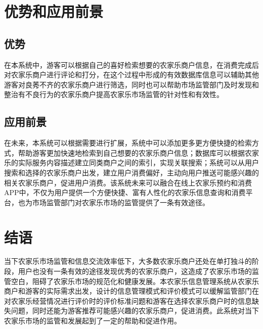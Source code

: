\documentclass[]{article}
\begin{document}
	\section{优势和应用前景}
	\subsection{优势}
	在本系统中，游客可以根据自己的喜好检索想要的农家乐商户信息，在消费完成后对农家乐商户进行评论和打分，在这个过程中形成的有效数据库信息可以辅助其他游客对良莠不齐的农家乐商户进行筛选，同时也可以帮助市场监管部门及时发现和整治有不良行为的农家乐商户提高农家乐市场监管的针对性和有效性。
	\subsection{应用前景}
	在未来，本系统可以根据需要进行扩展，系统中可以添加更多更方便快捷的检索方式，帮助游客更加快速地检索到自己想要的农家乐商户信息；数据库可以根据农家乐的实际服务内容描述建立同类商户之间的索引，实现关联搜索；系统可以从用户搜索和选择的农家乐商户出发，建立用户消费偏好，主动向用户推送可能感兴趣的相关农家乐商户，促进用户消费。该系统未来可以融合在线上农家乐预约和消费APP中，不仅为用户提供一个方便快捷、富有人性化的农家乐信息查询和消费平台，也为市场监管部门对农家乐市场的监管提供了一条有效途径。
	\section{结语}
	当下农家乐市场监管和信息交流效率低下，大多数农家乐商户还处在单打独斗的阶段，用户也没有一条有效的途径发现优秀的农家乐商户，这造成了农家乐市场的监管空白，阻碍了农家乐市场的规范化和健康发展。本农家乐信息管理系统从农家乐商户和游客的实际需求出发，设计的信息管理模式和评价模式可以缓解监管部门在对农家乐经营情况进行评价时的评价标准问题和游客在选择农家乐商户时的信息缺失问题，同时还能为游客推荐可能感兴趣的农家乐商户，促进消费。此系统对当下农家乐市场的监管和发展起到了一定的帮助和促进作用。
	
	
\end{document}
